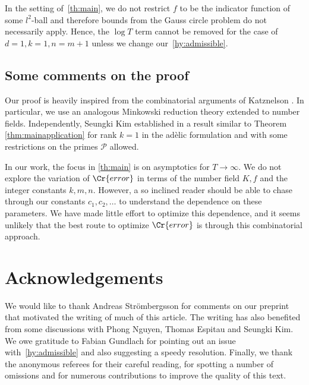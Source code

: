 \documentclass{amsart}
\theoremstyle{definition}
\theoremstyle{remark}
\begin{document}
In the setting of~\cref{th:main}, we do not restrict $f$ to be the indicator function of some $l^{2}$-ball and therefore bounds from the Gauss circle problem do not necessarily apply. Hence, the $\log T$ term cannot be removed for the case of $d=1,k=1,n=m+1$ unless we change our~\cref{hy:admissible}.


\subsection{Some comments on the proof}

Our proof is heavily inspired from the combinatorial arguments of Katznelson \cite{K1994}. 
In particular, we use an analogous Minkowski reduction theory extended to number fields. Independently, Seungki Kim established in \cite[Prop 3.2]{K19} a result similar to Theorem \ref{thm:mainapplication} for rank $k=1$ in the ad\`elic formulation and with some restrictions on the primes $\mathcal{P}$ allowed.


In our work, the focus in \cref{th:main} is on asymptotics for $T \rightarrow  \infty$.
We do not explore the variation of $\Cr{error}$ in terms of the number field $K,f$ and the integer constants $k,m,n$.
However, a so inclined reader should be able to chase through our constants $c_{1},c_{2},\dots$ to understand the dependence on these parameters.
We have made little effort to optimize this dependence, and it seems unlikely that the best route to optimize $\Cr{error}$ is through this combinatorial approach.

\section*{Acknowledgements}

We would like to thank Andreas Str\"ombergsson for comments on our preprint \cite{GSV23} that motivated the writing of much of this article. The writing has also benefited from some discussions with Phong Nguyen, Thomas Espitau and Seungki Kim.  
We owe gratitude to Fabian Gundlach for pointing out an issue with~\cref{hy:admissible} and also suggesting a speedy resolution. Finally, we thank the anonymous referees for their careful reading, for spotting a number of omissions and for numerous contributions to improve the quality of this text.
\end{document}
